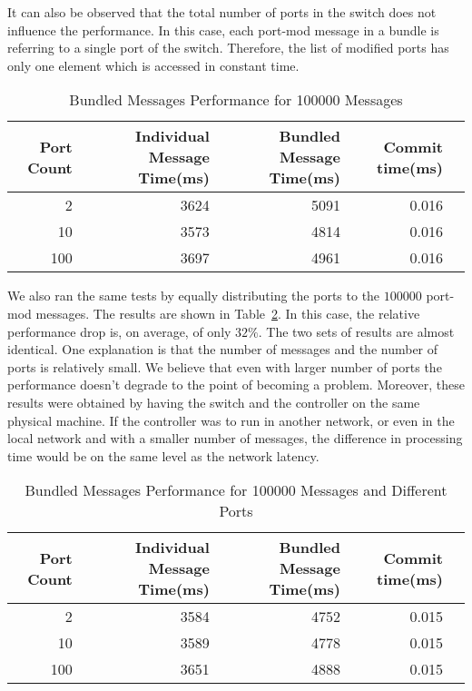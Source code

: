 It can also be observed that the total number of ports in the switch does not influence the performance.
In this case, each port-mod message in a bundle is referring to a single port of the switch. Therefore, the
list of modified ports has only one element which is accessed in constant time.

\begin{table}[h]
  \centering
  \begin{tabular}{rrrrr}
    \toprule
      Port Count & Individual Message Time(ms) & Bundled Message Time(ms) & Commit time(ms) \\
    \midrule
        2 & 3624 & 5091 & 0.016 \\
       10 & 3573 & 4814 & 0.016 \\
       100 & 3697 & 4961 & 0.016 \\
    \bottomrule
  \end{tabular}
  \caption{Bundled Messages Performance for 100000 Messages}
    \label{tbl:bundleperf}
\end{table}

We also ran the same tests by equally distributing the ports to the $100000$ port-mod messages. The results
are shown in Table~\ref{tbl:bundleperf2}. In this case, the relative performance drop is, on average, of only $32\%$.
The two sets of results are almost identical. One explanation is that the number of messages and the number of
ports is relatively small. We believe that even with larger number of ports the performance doesn't degrade
to the point of becoming a problem. Moreover, these results were obtained by having the switch and the controller
on the same physical machine. If the controller was to run in another network, or even in the local network
and with a smaller number of messages, the difference in processing time would be on the same level as the network latency.

\begin{table}[h]
  \centering
  \begin{tabular}{rrrrr}
    \toprule
      Port Count & Individual Message Time(ms) & Bundled Message Time(ms) & Commit time(ms) \\
    \midrule
        2 & 3584 & 4752 & 0.015 \\
       10 & 3589 & 4778 & 0.015 \\
       100 & 3651 & 4888 & 0.015 \\
    \bottomrule
  \end{tabular}
  \caption{Bundled Messages Performance for 100000 Messages and Different Ports}
    \label{tbl:bundleperf2}
\end{table}

